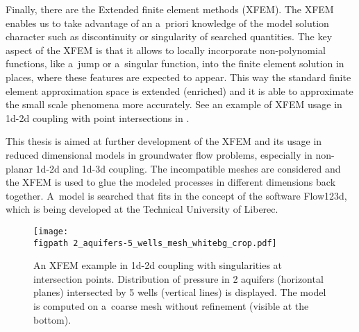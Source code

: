 Finally, there are the Extended finite element methods (XFEM).
The XFEM enables us to take advantage of an a~priori knowledge of the model solution character
such as discontinuity or singularity of searched quantities.
The key aspect of the XFEM is that it allows to locally incorporate non-polynomial functions, like a~jump or a~singular function,
into the finite element solution in places, where these features are expected to appear.
This way the standard finite element approximation space is extended (enriched) and it is able to approximate the small scale phenomena
more accurately.
See an example of XFEM usage in 1d-2d coupling with point intersections in .

This thesis is aimed at further development of the XFEM and its usage in reduced dimensional models in groundwater flow problems,
especially in non-planar 1d-2d and 1d-3d coupling. The incompatible meshes are considered and
the XFEM is used to glue the modeled processes in different dimensions back together. 
A~model is searched that fits in the concept of the software Flow123d, which is being developed at the
Technical University of Liberec.

\begin{figure}[!htb]
  \centering    
    \texttt{[image: \\figpath 2\_aquifers-5\_wells\_mesh\_whitebg\_crop.pdf]}
  \caption[XFEM example for well-aquifer model with singularities.]
        { An XFEM example in 1d-2d coupling with singularities at intersection points.
            Distribution of pressure in 2 aquifers (horizontal planes) intersected by 5 wells 
            (vertical lines) is displayed. The model is computed on a~coarse mesh without refinement (visible at the bottom). }
  \label{fig:aquifers}
\end{figure}




